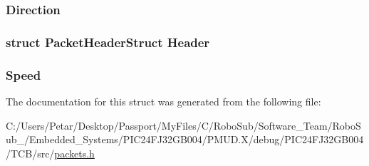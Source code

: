 \subsubsection[{Direction}]{ Direction}\label{struct_packet_motor_set_struct_a9e5dd9f1ebbbade8fbdc079530942301}
\hypertarget{struct_packet_motor_set_struct_ab201af50281aff5ed4f984f994938007}{}
\subsubsection[{Header}]{\setlength{\rightskip}{0pt plus 5cm}struct {\bf Packet\+Header\+Struct} Header}\label{struct_packet_motor_set_struct_ab201af50281aff5ed4f984f994938007}
\hypertarget{struct_packet_motor_set_struct_a2086864522a7bdf2603f5a19254376f0}{}
\subsubsection[{Speed}]{ Speed}\label{struct_packet_motor_set_struct_a2086864522a7bdf2603f5a19254376f0}


The documentation for this struct was generated from the following file\+:\begin{DoxyCompactItemize}
\item 
C\+:/\+Users/\+Petar/\+Desktop/\+Passport/\+My\+Files/\+C/\+Robo\+Sub/\+Software\+\_\+\+Team/\+Robo\+Sub\+\_/\+Embedded\+\_\+\+Systems/\+P\+I\+C24\+F\+J32\+G\+B004/\+P\+M\+U\+D.\+X/debug/\+P\+I\+C24\+F\+J32\+G\+B004/\+T\+C\+B/src/\hyperlink{_p_m_u_d_8_x_2debug_2_p_i_c24_f_j32_g_b004_2_t_c_b_2src_2packets_8h}{packets.\+h}\end{DoxyCompactItemize}
